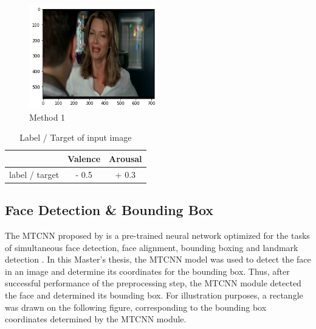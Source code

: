 \begin{center}
\begin{figure}[H]
  \begin{center}
  \includegraphics[angle=0, width=0.5\textwidth]{Figures/method_1.png}
  \caption{Method 1}
  \label{fig:MachineLearningModelMethod_1}
  \end{center}
\end{figure}
\end{center}

\begin{table}[H]
\begin{center}
\begin{tabular}{@{}ccc@{}}
\toprule
 & Valence & Arousal \\ \midrule
\multicolumn{1}{r}{label / target} & - 0.5 & + 0.3 \\ \bottomrule
\end{tabular}
\caption{Label / Target of input image}
\label{tab:LabelTarget}
\end{center}
\end{table}


\subsection{Face Detection \& Bounding Box}
The \gls{MTCNN} proposed by \citet{Zhang:2016:MTCCN} is a pre-trained neural network optimized for the tasks of simultaneous face detection, face alignment, bounding boxing and landmark detection \citep{Brownlee:2019:VggFace2HowToFaceRec}.
\newline\newline
In this Master's thesis, the \gls{MTCNN} model was used to detect the face in an image and determine its coordinates for the bounding box. Thus, after successful performance of the preprocessing step, the \gls{MTCNN} module detected the face and determined its bounding box. For illustration purposes, a rectangle was drawn on the following figure, corresponding to the bounding box coordinates determined by the \gls{MTCNN} module.

